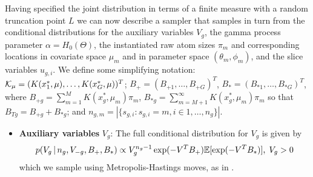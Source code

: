 Having specified the joint distribution in terms of a finite measure with a
random truncation point $L$ we can now describe a sampler that samples in turn
from the conditional distributions for the auxiliary variables $V_g$, the gamma
process parameter $\alpha = H_0(\Theta)$, the instantiated raw atom 
sizes $\pi_m$ and
corresponding locations in covariate space $\mu_m$ and in parameter space
$(\theta_m, \phi_m)$, and the slice variables $u_{g,i}$.  We define some
simplifying notation: $\mathcal{K}_\mu = (K(x_1^*,\mu),\ldots, K(x_G^*,\mu))^T$; $B_+ = (B_{+1},\ldots,B_{+G})^T$, 
$B_* = (B_{*1},\ldots,B_{*G})^T$, where  $B_{+g} =
\sum_{m=1}^M K(x^*_g,\mu_m)\pi_m$, $B_{*g} = \sum_{m=M+1}^\infty
K(x^*_g,\mu_m)\pi_m$ so that $B_{Tg} = B_{+g} + B_{*g}$; and $n_{g,m} =
|\{s_{g,i} : s_{g,i} = m, i \in 1,\ldots,n_g\}|$.
\begin{itemize} 
  \item \textbf{Auxiliary variables} $V_g$: The full conditional distribution 
    for $V_g$ is given by
    \begin{equation} p(V_g \, | \, n_g, V_{-g}, B_+, B_*) \propto
      V_g^{n_g-1}\exp(-V^TB_+)\mathbb{E}[\exp(-V^TB_*)], \; V_g > 0 
      \label{eqn:postvg}
    \end{equation} 
    which we sample using Metropolis-Hastings moves,
    as in \cite{GriffinKolSteel:2010}.


\end{itemize}
